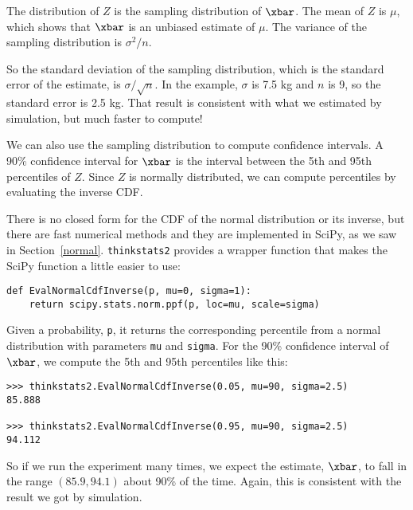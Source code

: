 \documentclass[12pt]{book}
\begin{document}
The distribution of $Z$ is the sampling distribution of $\xbar$.
The mean of $Z$ is $\mu$, which shows that $\xbar$ is an unbiased
estimate of $\mu$.  The variance of the sampling distribution
is $\sigma^2 / n$.

So the standard deviation of the sampling distribution, which is the
standard error of the estimate, is $\sigma / \sqrt{n}$.  In the
example, $\sigma$ is 7.5 kg and $n$ is 9, so the standard error is 2.5
kg.  That result is consistent with what we estimated by simulation,
but much faster to compute!

We can also use the sampling distribution to compute confidence
intervals.  A 90\% confidence interval for $\xbar$ is the interval
between the 5th and 95th percentiles of $Z$.  Since $Z$ is normally
distributed, we can compute percentiles by evaluating the inverse
CDF.

There is no closed form for the CDF of the normal distribution
or its inverse, but there are fast numerical methods and they
are implemented in SciPy, as we saw in Section~\ref{normal}.
{\tt thinkstats2} provides a wrapper function that makes the
SciPy function a little easier to use:

\begin{verbatim}
def EvalNormalCdfInverse(p, mu=0, sigma=1):
    return scipy.stats.norm.ppf(p, loc=mu, scale=sigma)
\end{verbatim}

Given a probability, {\tt p}, it returns the corresponding
percentile from a normal distribution with parameters {\tt mu}
and {\tt sigma}.  For the 90\% confidence interval of $\xbar$,
we compute the 5th and 95th percentiles like this:

\begin{verbatim}
>>> thinkstats2.EvalNormalCdfInverse(0.05, mu=90, sigma=2.5)
85.888

>>> thinkstats2.EvalNormalCdfInverse(0.95, mu=90, sigma=2.5)
94.112
\end{verbatim}

So if we run the experiment many times, we expect the
estimate, $\xbar$, to fall in the range $(85.9, 94.1)$ about
90\% of the time.  Again, this is consistent with the result
we got by simulation.
\end{document}
